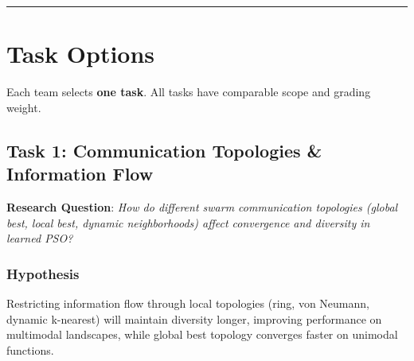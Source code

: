 \documentclass[11pt,a4paper]{scrartcl}
\newcommand{\sectiondivider}{%
  \vspace{0.2em}%
  \noindent\textcolor{rulecolor}{\rule{0.3\textwidth}{0.4pt}}%
  \vspace{0.3em}%
}
\begin{document}
\sectiondivider

\section*{Task Options}

Each team selects \textbf{one task}. All tasks have comparable scope and grading weight.

\subsection*{Task 1: Communication Topologies \& Information Flow}

\textbf{Research Question}: \textit{How do different swarm communication topologies (global best, local best, dynamic neighborhoods) affect convergence and diversity in learned PSO?}

\subsubsection*{Hypothesis}
Restricting information flow through local topologies (ring, von Neumann, dynamic k-nearest) will maintain diversity longer, improving performance on multimodal landscapes, while global best topology converges faster on unimodal functions.
\end{document}
